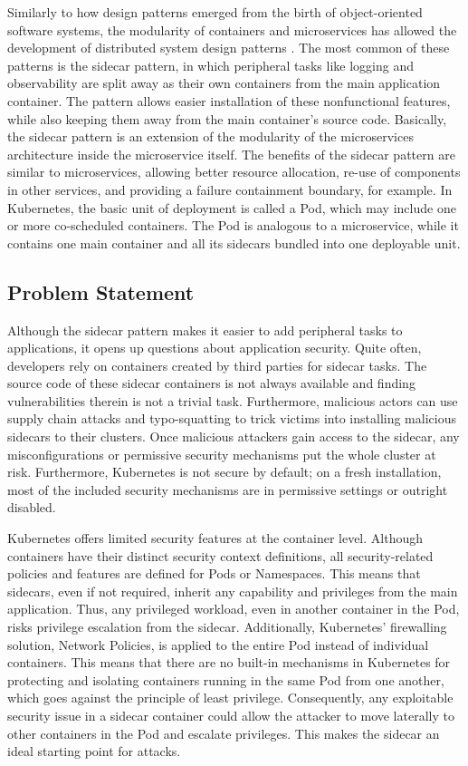 \documentclass[english, 12pt, a4paper, sci, utf8, a-2b, online]{aaltothesis}
\begin{document}
Similarly to how design patterns emerged from the birth of object-oriented software systems, the modularity of containers and microservices has allowed the development of distributed system design patterns \cite{burns2016design}.
The most common of these patterns is the sidecar pattern, in which peripheral tasks like logging and observability are split away as their own containers from the main application container.
The pattern allows easier installation of these nonfunctional features, while also keeping them away from the main container's source code.
Basically, the sidecar pattern is an extension of the modularity of the microservices architecture inside the microservice itself.
The benefits of the sidecar pattern are similar to microservices, allowing better resource allocation, re-use of components in other services, and providing a failure containment boundary, for example.
In Kubernetes, the basic unit of deployment is called a Pod, which may include one or more co-scheduled containers.
The Pod is analogous to a microservice, while it contains one main container and all its sidecars bundled into one deployable unit.

\subsection{Problem Statement}

Although the sidecar pattern makes it easier to add peripheral tasks to applications, it opens up questions about application security.
Quite often, developers rely on containers created by third parties for sidecar tasks.
The source code of these sidecar containers is not always available and finding vulnerabilities therein is not a trivial task.
Furthermore, malicious actors can use supply chain attacks and typo-squatting to trick victims into installing malicious sidecars to their clusters.
Once malicious attackers gain access to the sidecar, any misconfigurations or permissive security mechanisms put the whole cluster at risk.
Furthermore, Kubernetes is not secure by default; on a fresh installation, most of the included security mechanisms are in permissive settings or outright disabled.

Kubernetes offers limited security features at the container level.
Although containers have their distinct security context definitions, all security-related policies and features are defined for Pods or Namespaces.
This means that sidecars, even if not required, inherit any capability and privileges from the main application.
Thus, any privileged workload, even in another container in the Pod, risks privilege escalation from the sidecar.
Additionally, Kubernetes' firewalling solution, Network Policies, is applied to the entire Pod instead of individual containers.
This means that there are no built-in mechanisms in Kubernetes for protecting and isolating containers running in the same Pod from one another, which goes against the principle of least privilege.
Consequently, any exploitable security issue in a sidecar container could allow the attacker to move laterally to other containers in the Pod and escalate privileges.
This makes the sidecar an ideal starting point for attacks.
\end{document}
